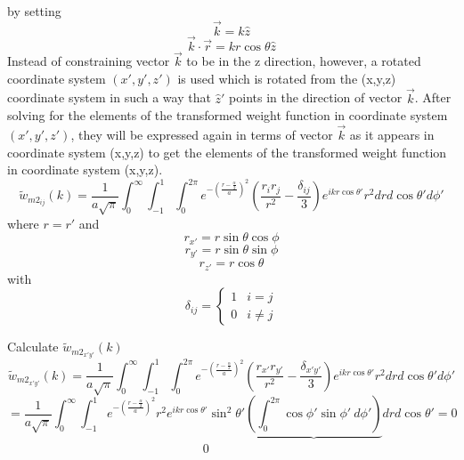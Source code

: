 \documentclass[double,12pt]{beavtex}
\begin{document}
by setting 
\begin{equation}{\vec{k}=k\hat{z}}\end{equation}
\begin{equation}{\vec{k}\cdot\vec{r}=kr\cos\theta\hat{z}}\end{equation}
Instead of constraining vector $\vec{k}$ to be in the z direction, 
however, a rotated coordinate system $(x',y',z')$ is used which is 
rotated from the (x,y,z) coordinate system in such a way that $\hat{z}'$ 
points in the direction of vector $\vec{k}$. After solving for the 
elements of the transformed weight function in coordinate system 
$(x',y',z')$, they will be expressed again in terms of vector $\vec{k}$ 
as it appears in coordinate system (x,y,z) to get the elements of the 
transformed weight function in coordinate system (x,y,z). 
\begin{equation}{\widetilde{w}_{m2_{ij}}(k)=\frac{1}{a\sqrt{\pi}}\int_{0}^{\infty}\int_{-1}^{1}\int_{0}^{2\pi}e^{-\left(\frac{r-\frac{\alpha}{2}}{a}\right)^2}\left(\frac{r_ir_j}{r^2}-\frac{\delta_{ij}}{3}\right)e^{ikr\cos\theta'}r^2d{r}d{\cos\theta'}d{\phi'}}\end{equation}
where $r=r'$ and
\begin{displaymath}{r_{x'}=r\sin\theta\cos\phi}\end{displaymath}
\begin{displaymath}{r_{y'}=r\sin\theta\sin\phi}\end{displaymath}
\begin{displaymath}{r_{z'}=r\cos\theta}\end{displaymath} 
with
\begin{displaymath}{\delta_{ij}=\left\{ \begin{array}{rc} 1 & i = j \\ 0  & i\neq j \end{array}\right.}\end{displaymath}

Calculate $\widetilde{w}_{{m2}_{x'y'}}(k)$ 
\begin{equation}{\widetilde{w}_{{m2}_{x'y'}}(k)=\frac{1}{a\sqrt{\pi}}\int_{0}^{\infty}\int_{-1}^{1}\int_{0}^{2\pi}e^{-\left(\frac{r-\frac{\alpha}{2}}{a}\right)^2}\left(\frac{r_{x'}r_{y'}}{r^2}-\frac{\delta_{x'y'}}{3}\right)e^{ikr\cos\theta'}r^2d{r}d{\cos\theta'}d{\phi'}}\end{equation}
\begin{equation}{=\frac{1}{a\sqrt{\pi}}\int_{0}^{\infty}\int_{-1}^{1}e^{-\left(\frac{r-\frac{\alpha}{2}}{a}\right)^2}r^2e^{ikr\cos\theta'}\sin^2\theta'\underbrace{\left(\int_{0}^{2\pi}\cos\phi'\sin{\phi'}~d{\phi'}\right)}d{r}d{\cos\theta'}=0}\end{equation}
$~~~~~~~~~~~~~~~~~~~~~~~~~~~~~~~~~~~~~~~~~~~~~~~~~~~~~~~~~~~~~~~~~~~~~~~0$
\end{document}
